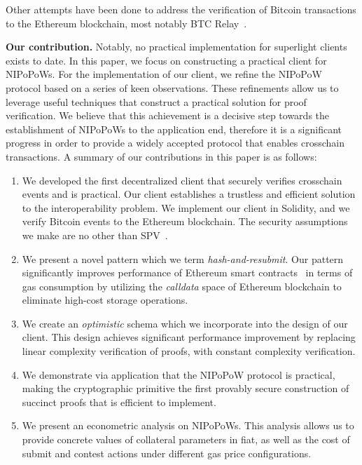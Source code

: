 Other attempts have been done to address the verification of Bitcoin
transactions to the Ethereum blockchain, most notably BTC
Relay~\cite{btcrelay}.

\noindent

\textbf{Our contribution.} Notably, no practical implementation for superlight
clients exists to date. In this paper, we focus on constructing a practical
client for NIPoPoWs. For the implementation of our client, we refine the
NIPoPoW protocol based on a series of keen observations. These refinements
allow us to leverage useful techniques that construct a practical solution for
proof verification. We believe that this achievement is a decisive step towards
the establishment of NIPoPoWs to the application end, therefore it is a
significant progress in order to provide a widely accepted protocol that
enables crosschain transactions. A summary of our contributions in this paper
is as follows:
\begin{enumerate}
\item We developed the first decentralized client that securely verifies
crosschain events and is practical. Our client establishes a trustless and
efficient solution to the interoperability problem. We implement our client
in Solidity, and we verify Bitcoin events to the Ethereum blockchain. The
security assumptions we make are no other than
SPV~\cite{eclipse, eclipse-ethereum}.
\item We present a novel pattern which we term \emph{hash-and-resubmit}. Our
pattern significantly improves performance of Ethereum smart
contracts~\cite{wood, buterin} in terms of gas consumption by utilizing the
\emph{calldata} space of Ethereum blockchain to eliminate high-cost storage
operations.
\item We create an \emph{optimistic} schema which we incorporate into the design
of our client. This design achieves significant performance improvement by
replacing linear complexity verification of proofs, with constant complexity
verification.
\item We demonstrate via application that the NIPoPoW protocol is practical,
making the cryptographic primitive the first provably secure construction of
succinct proofs that is efficient to implement.
\item We present an econometric analysis on NIPoPoWs. This analysis allows us
to provide concrete values of collateral parameters in fiat, as well as the
cost of submit and contest actions under different gas price configurations.

\end{enumerate}

